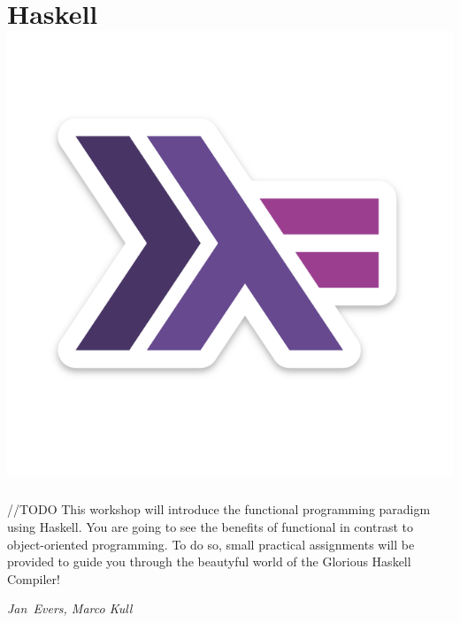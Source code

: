 \section*{Haskell\hfill\includegraphics[width=.35\linewidth]{images/haskell-logo.png}}
//TODO
This workshop will introduce the functional programming paradigm using Haskell. You are going to see the benefits of functional  in contrast to object-oriented programming. To do so, small practical assignments will be provided to guide you through the beautyful world of the Glorious Haskell Compiler! 

\hfill\textit{Jan~Evers, Marco Kull}